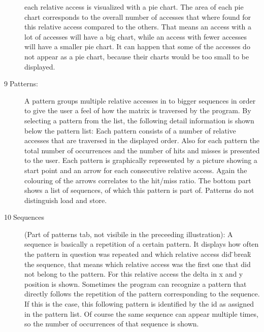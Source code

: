 \begin{description}
each relative access is visualized with a pie chart. The area of each
pie chart corresponds to the overall number of accesses that where
found for this relative access compared to the others. That means
an access with a lot of accesses will have a big chart, while an access
with fewer accesses will have a smaller pie chart. It can happen that
some of the accesses do not appear as a pie chart, because their charts
would be too small to be displayed.
\item [{9$\;$Patterns:}] A pattern groups multiple relative accesses in
to bigger sequences in order to give the user a feel of how the matrix
is traversed by the program. By selecting a pattern from the list,
the following detail information is shown below the pattern list:
Each pattern consists of a number of relative accesses that are traversed
in the displayed order. Also for each pattern the total number of
occurrences and the number of hits and misses is presented to the
user. Each pattern is graphically represented by a picture showing
a start point and an arrow for each consecutive relative access. Again
the colouring of the arrows correlates to the hit/miss ratio. The
bottom part shows a list of sequences, of which this pattern is part
of. Patterns do not distinguish load and store.
\item [{10$\;$Sequences}] (Part of patterns tab, not visibile in the preceeding
illustration): A sequence is basically a repetition of a certain pattern.
It displays how often the pattern in question was repeated and which
relative access did \"{}break\"{} the sequence,
that means which relative access was the first one that did not belong
to the pattern. For this relative access the delta in x and y position
is shown. Sometimes the program can recognize a pattern that directly
follows the repetition of the pattern corresponding to the sequence.
If this is the case, this following pattern is identified by the id
as assigned in the pattern list. Of course the same sequence can appear
multiple times, so the number of occurrences of that sequence is shown.\end{description}
